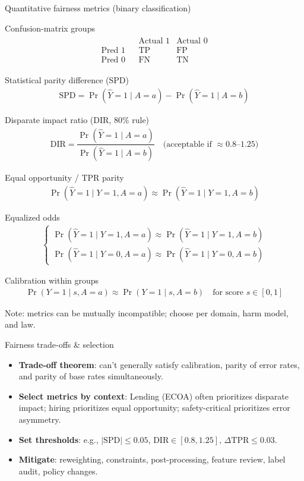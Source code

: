 \documentclass[11pt,aspectratio=169]{beamer}
\newcommand{\Equation}[2]{%
  \begin{block}{#1}
  \begin{gather*}
    #2
  \end{gather*}
  \end{block}
}
\newcommand{\tinyref}[1]{\textcolor{black!60}{\scriptsize#1}}
\begin{document}
\begin{frame}{Quantitative fairness metrics (binary classification)}
\small
\Equation{Confusion-matrix groups}{%
\begin{matrix}
& & \text{Actual }1 & \text{Actual }0\\
\text{Pred }1 & & \text{TP} & \text{FP}\\
\text{Pred }0 & & \text{FN} & \text{TN}
\end{matrix}
}
\Equation{Statistical parity difference (SPD)}{%
\mathrm{SPD} = \Pr(\hat{Y}=1\mid A=a) - \Pr(\hat{Y}=1\mid A=b)
}
\Equation{Disparate impact ratio (DIR, 80\% rule)}{%
\mathrm{DIR} = \dfrac{\Pr(\hat{Y}=1\mid A=a)}{\Pr(\hat{Y}=1\mid A=b)}\quad \text{(acceptable if } \approx 0.8\text{–}1.25)
}
\Equation{Equal opportunity / TPR parity}{%
\Pr(\hat{Y}=1\mid Y=1, A=a) \approx \Pr(\hat{Y}=1\mid Y=1, A=b)
}
\Equation{Equalized odds}{%
\begin{cases}
\Pr(\hat{Y}=1\mid Y=1, A=a) \approx \Pr(\hat{Y}=1\mid Y=1, A=b)\\
\Pr(\hat{Y}=1\mid Y=0, A=a) \approx \Pr(\hat{Y}=1\mid Y=0, A=b)
\end{cases}
}
\Equation{Calibration within groups}{%
\Pr(Y=1\mid s, A=a) \approx \Pr(Y=1\mid s, A=b) \quad \text{for score } s\in[0,1]
}
\tinyref{Note: metrics can be mutually incompatible; choose per domain, harm model, and law.}
\end{frame}

\begin{frame}{Fairness trade-offs \& selection}
\begin{itemize}
  \item \textbf{Trade-off theorem}: can’t generally satisfy calibration, parity of error rates, and parity of base rates simultaneously.
  \item \textbf{Select metrics by context}: Lending (ECOA) often prioritizes disparate impact; hiring prioritizes equal opportunity; safety-critical prioritizes error asymmetry.
  \item \textbf{Set thresholds}: e.g., $|\mathrm{SPD}|\le 0.05$, $\mathrm{DIR}\in[0.8,1.25]$, $\Delta\mathrm{TPR}\le 0.03$.
  \item \textbf{Mitigate}: reweighting, constraints, post-processing, feature review, label audit, policy changes.
\end{itemize}
\end{frame}
\end{document}
